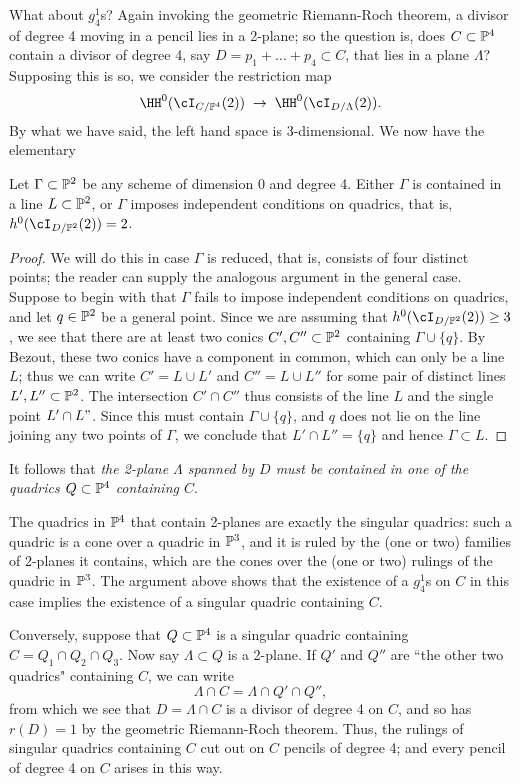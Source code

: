 What about $g^1_4$s? Again invoking the geometric Riemann-Roch theorem, a divisor of degree 4 moving in a pencil lies in a 2-plane; so the question is, does $C \subset \PP^4$ contain a divisor of degree 4, say $D = p_1+\dots +p_4 \subset C$, that lies in a plane $\Lambda$? Supposing this is so, we consider the restriction map
$$
\HH^0(\cI_{C/\PP^4}(2)) \; \to \; \HH^0(\cI_{D/\Lambda}(2)).
$$
By what we have said, the left hand space is 3-dimensional. We now have the elementary

\begin{lemma}
Let $\Gamma \subset \PP^2$ be any scheme of dimension 0 and degree 4. Either $\Gamma$ is contained in a line $L \subset \PP^2$, or $\Gamma$ imposes independent conditions on quadrics, that is, $h^0(\cI_{D/\PP^2}(2)) = 2$.
\end{lemma}

\begin{proof}
We will do this in case $\Gamma$ is reduced, that is, consists of four distinct points; the reader can supply the analogous argument in the general case. Suppose to begin with that $\Gamma$ fails to impose independent conditions on quadrics, and let $q \in \PP^2$ be a general point. Since we are assuming that $h^0(\cI_{D/\PP^2}(2)) \geq 3$, we see that there are at least two conics $C', C'' \subset \PP^2$ containing $\Gamma \cup \{q\}$. By Bezout, these two conics have a component in common, which can only be a line $L$; thus we can write $C' = L \cup L'$ and $C'' = L \cup L''$ for some pair of distinct lines $L', L'' \subset \PP^2$. The intersection $C' \cap C''$ thus consists of the line $L$ and the single point $L' \cap L"$. Since this must contain $\Gamma \cup \{q\}$, and $q$ does not lie on the line joining any two points of $\Gamma$, we conclude that $L' \cap L'' = \{q\}$ and hence $\Gamma \subset L$.
\end{proof}

 It follows that \emph{the 2-plane $\Lambda$ spanned by $D$ must be contained in one of the quadrics $Q \subset \PP^4$ containing $C$}. 

The quadrics in $\PP^4$ that contain 2-planes are exactly the singular quadrics: such a quadric is a cone over a quadric in $\PP^3$, and it is ruled by the (one or two) families of 2-planes it contains, which are the cones over the (one or two) rulings of the quadric in $\PP^3$. The argument above shows that the existence of a $g_4^1$s on $C$ in this case implies the existence of a singular quadric containing $C$.

Conversely, suppose that $Q \subset \PP^4$ is a singular quadric containing $C = Q_1 \cap Q_2 \cap Q_3$. Now say $\Lambda \subset Q$ is  a 2-plane. If $Q'$ and $Q''$ are ``the other two quadrics" containing $C$, we can write
$$
\Lambda \cap C = \Lambda \cap Q' \cap Q'', 
$$ 
from which we see that $D = \Lambda \cap C$ is a divisor of degree 4 on $C$, and so has $r(D) = 1$ by the geometric Riemann-Roch theorem. Thus, the rulings of  singular quadrics containing $C$ cut out on $C$ pencils of degree 4; and every pencil of degree 4 on $C$ arises in this way.

